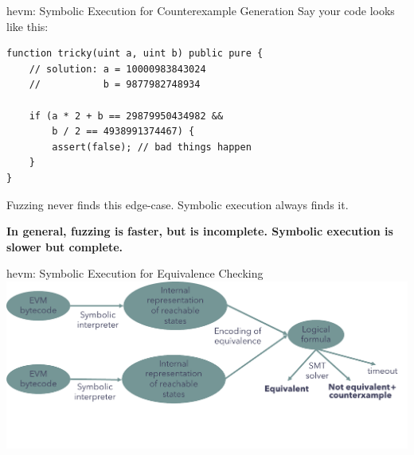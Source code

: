 \documentclass[aspectratio=169]{beamer}
\begin{document}
\begin{frame}[fragile=singleslide]{hevm: Symbolic Execution for Counterexample Generation}
Say your code looks like this:

\begin{Verbatim}[frame=single, framerule=0.2mm, framesep=2mm,fontsize=\small]
function tricky(uint a, uint b) public pure {
	// solution: a = 10000983843024
	//           b = 9877982748934
	
	if (a * 2 + b == 29879950434982 &&
	    b / 2 == 4938991374467) {
		assert(false); // bad things happen
	}
}
\end{Verbatim}

Fuzzing never finds this edge-case. Symbolic execution always finds it.
\bigskip 

\textbf{In general, fuzzing is faster, but is incomplete. Symbolic execution is slower but complete.}

\end{frame}

%	
%

\begin{frame}{hevm: Symbolic Execution for Equivalence Checking}
\centering
\includegraphics[scale=0.45]{equivalence-pipeline}
\end{frame}
\end{document}
